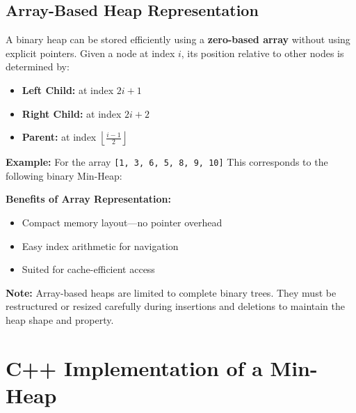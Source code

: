 \documentclass{article}
\begin{document}
\subsection{Array-Based Heap Representation}

A binary heap can be stored efficiently using a \textbf{zero-based array} without using explicit pointers. Given a node at index $i$, its position relative to other nodes is determined by:

\begin{itemize}
  \item \textbf{Left Child:} at index $2i + 1$
  \item \textbf{Right Child:} at index $2i + 2$
  \item \textbf{Parent:} at index $\left\lfloor \frac{i - 1}{2} \right\rfloor$
\end{itemize}

\textbf{Example:} For the array \texttt{[1, 3, 6, 5, 8, 9, 10]}  
This corresponds to the following binary Min-Heap:

\begin{center}
\end{center}

\textbf{Benefits of Array Representation:}
\begin{itemize}
  \item Compact memory layout—no pointer overhead
  \item Easy index arithmetic for navigation
  \item Suited for cache-efficient access
\end{itemize}

\textbf{Note:} 
Array-based heaps are limited to complete binary trees. They must be restructured or resized carefully during insertions and deletions to maintain the heap shape and property.

\section{C++ Implementation of a Min-Heap}
\end{document}
